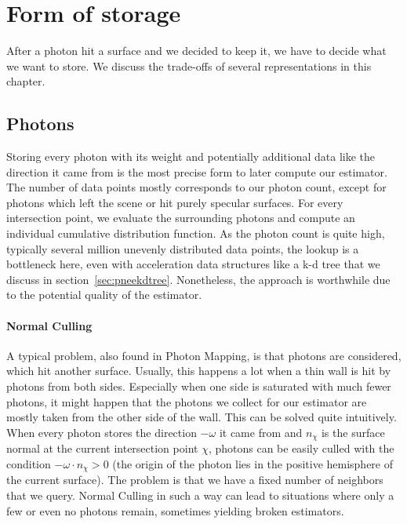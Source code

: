 \section{Form of storage}
\label{ch:formofstorage}

After a photon hit a surface and we decided to keep it, we have to decide what we want to store. We discuss the trade-offs of several representations in this chapter. 

\subsection{Photons}

Storing every photon with its weight and potentially additional data like the direction it came from is the most precise form to later compute our estimator. The number of data points mostly corresponds to our photon count, except for photons which left the scene or hit purely specular surfaces. For every intersection point, we evaluate the surrounding photons and compute an individual cumulative distribution function. As the photon count is quite high, typically several million unevenly distributed data points, the lookup is a bottleneck here, even with acceleration data structures like a k-d tree that we discuss in section~\ref{sec:pneekdtree}. Nonetheless, the approach is worthwhile due to the potential quality of the estimator.

\paragraph*{Normal Culling}
\label{ch:normalculling}

A typical problem, also found in Photon Mapping, is that photons are considered, which hit another surface. Usually, this happens a lot when a thin wall is hit by photons from both sides. Especially when one side is saturated with much fewer photons, it might happen that the photons we collect for our estimator are mostly taken from the other side of the wall. This can be solved quite intuitively. When every photon stores the direction $-\omega$ it came from and $n_{\chi}$ is the surface normal at the current intersection point $\chi$, photons can be easily culled with the condition $-\omega\cdot n_{\chi} > 0$ (the origin of the photon lies in the positive hemisphere of the current surface). The problem is that we have a fixed number of neighbors that we query. Normal Culling in such a way can lead to situations where only a few or even no photons remain, sometimes yielding broken estimators.

